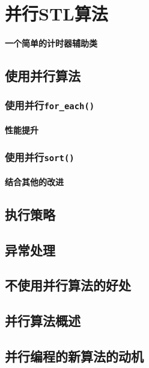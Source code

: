 \chapter{并行STL算法}\label{ch22}

\subsubsection{一个简单的计时器辅助类}


\section{使用并行算法}

\subsection{使用并行\texttt{for\_each()}}

\subsubsection{性能提升}

\subsection{使用并行\texttt{sort()}}

\subsubsection{结合其他的改进}\label{ch22.1.2.1}


\section{执行策略}\label{ch22.2}


\section{异常处理}


\section{不使用并行算法的好处}


\section{并行算法概述}


\section{并行编程的新算法的动机}

